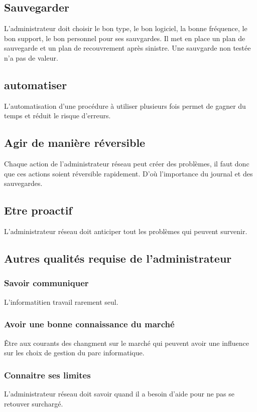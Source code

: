 \documentclass[10pt,a4paper]{article}
\begin{document}
 \subsection{Sauvegarder}
 L'administrateur doit choisir le bon type, le bon logiciel, la bonne fréquence, le bon support, le bon personnel pour ses sauvgardes. Il met en place un plan de sauvegarde et un plan de recouvrement après sinistre.
 Une sauvgarde non testée n'a pas de valeur.

 \subsection{automatiser}
 L'automatisation d'une procédure à utiliser plusieurs fois permet de gagner du temps et réduit le risque d'erreurs.

 \subsection{Agir de manière réversible}
 Chaque action de l'administrateur réseau peut créer des problèmes, il faut donc que ces actions soient réversible rapidement. D'où l'importance du journal et des sauvegardes.

 \subsection{Etre proactif}
 L'administrateur réseau doit anticiper tout les problèmes qui peuvent survenir.

 \subsection{Autres qualités requise de l'administrateur}
 \subsubsection{Savoir communiquer}
 L'informatitien travail rarement seul.
 \subsubsection{Avoir une bonne connaissance du marché}
 Être aux courants des changment sur le marché qui peuvent avoir une influence sur les choix de gestion du parc informatique.
 \subsubsection{Connaitre ses limites}
 L'administrateur réseau doit savoir quand il a besoin d'aide pour ne pas se retouver surchargé.
\end{document}
